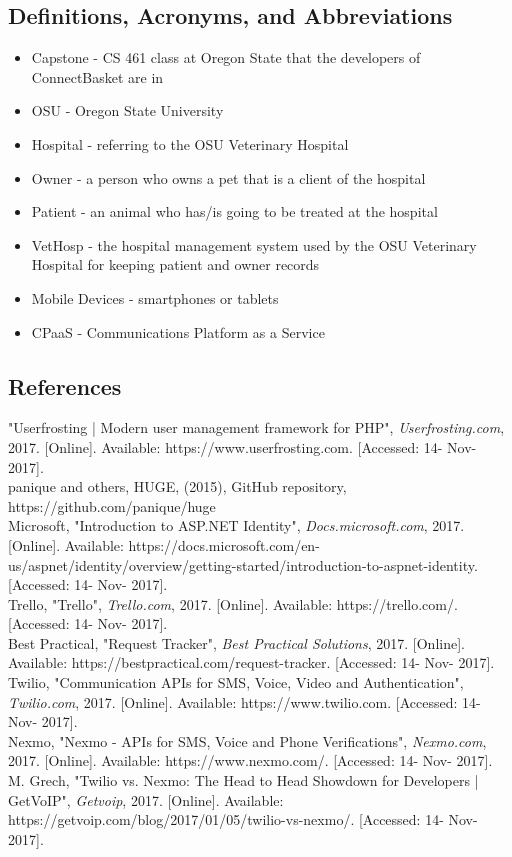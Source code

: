 \documentclass[onecolumn, draftclsnofoot,10pt, compsoc]{IEEEtran}
\begin{document}
\subsection{Definitions, Acronyms, and Abbreviations}
\begin{itemize}
\item Capstone - CS 461 class at Oregon State that the developers of ConnectBasket are in
 
\item OSU - Oregon State University

\item Hospital - referring to the OSU Veterinary Hospital

\item Owner - a person who owns a pet that is a client of the hospital

\item Patient - an animal who has/is going to be treated at the hospital 

\item VetHosp - the hospital management system used by the OSU Veterinary Hospital for keeping patient and owner records

\item Mobile Devices - smartphones or tablets

\item CPaaS  - Communications Platform as a Service
\end{itemize}
\subsection{References}
"Userfrosting | Modern user management framework for PHP", \textit{Userfrosting.com}, 2017. [Online]. Available: https://www.userfrosting.com. [Accessed: 14- Nov- 2017].\\
panique and others, HUGE, (2015), GitHub repository, https://github.com/panique/huge\\
Microsoft, "Introduction to ASP.NET Identity", \textit{Docs.microsoft.com}, 2017. [Online]. Available: https://docs.microsoft.com/en-us/aspnet/identity/overview/getting-started/introduction-to-aspnet-identity. [Accessed: 14- Nov- 2017].\\
Trello, "Trello", \textit{Trello.com}, 2017. [Online]. Available: https://trello.com/. [Accessed: 14- Nov- 2017].\\
Best Practical, "Request Tracker", \textit{Best Practical Solutions}, 2017. [Online]. Available: https://bestpractical.com/request-tracker. [Accessed: 14- Nov- 2017].\\
Twilio, "Communication APIs for SMS, Voice, Video and Authentication", \textit{Twilio.com}, 2017. [Online]. Available: https://www.twilio.com. [Accessed: 14- Nov- 2017].\\
Nexmo, "Nexmo - APIs for SMS, Voice and Phone Verifications", \textit{Nexmo.com}, 2017. [Online]. Available: https://www.nexmo.com/. [Accessed: 14- Nov- 2017].\\
M. Grech, "Twilio vs. Nexmo: The Head to Head Showdown for Developers | GetVoIP", \textit{Getvoip}, 2017. [Online]. Available: https://getvoip.com/blog/2017/01/05/twilio-vs-nexmo/. [Accessed: 14- Nov- 2017].\\
\end{document}
